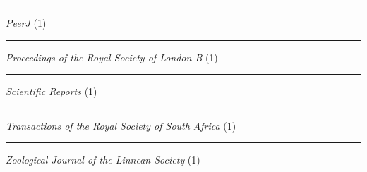 \documentclass[margin,line]{res}
\begin{document}
\begin{resume}
\rule{-1mm}{5mm} \hspace*{4mm} \textit{PeerJ} (1) \\
\rule{-1mm}{5mm} \hspace*{4mm} \textit{Proceedings of the Royal Society of London B} (1) \\
\rule{-1mm}{5mm} \hspace*{4mm} \textit{Scientific Reports} (1) \\
\rule{-1mm}{5mm} \hspace*{4mm} \textit{Transactions of the Royal Society of South Africa} (1) \\
\rule{-1mm}{5mm} \hspace*{4mm} \textit{Zoological Journal of the Linnean Society} (1) \\




\end{resume}
\end{document}
